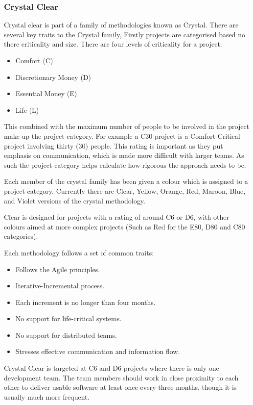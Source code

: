 \documentclass[11pt,a4paper]{article}
\begin{document}
\subsubsection{Crystal Clear}
Crystal clear is part of a family of methodologies known as Crystal. There are several key traits to the Crystal family, Firstly projects are categorised based no there criticality and size. There are four levels of criticality for a project:

\begin{itemize}
\item Comfort (C)
\item Discretionary Money (D)
\item Essential Money (E)
\item Life (L)
\end{itemize}

This combined with the maximum number of people to be involved in the project make up the project category. For example a C30 project is a Comfort-Critical project involving thirty (30) people. This rating is important as they put emphasis on communication, which is made more difficult with larger teams. As such the project category helps calculate how rigorous the approach needs to be. 

Each member of the crystal family has been given a colour which is assigned to a project category. Currently there are Clear, Yellow, Orange, Red, Maroon, Blue, and Violet versions of the crystal methodology. 

Clear is designed for projects with a rating of around C6 or D6, with other colours aimed at more complex projects (Such as Red for the E80, D80 and C80 categories). 

Each methodology follows a set of common traits:

\begin{itemize}
\item Follows the Agile principles. 
\item Iterative-Incremental process. 
\item Each increment is no longer than four months.
\item No support for life-critical systems.
\item No support for distributed teams. 
\item Stresses effective communication and information flow. 
\end{itemize}

Crystal Clear is targeted at C6 and D6 projects where there is only one development team. The team members should work in close proximity to each other to deliver usable software at least once every three months, though it is usually much more frequent. 
\end{document}

